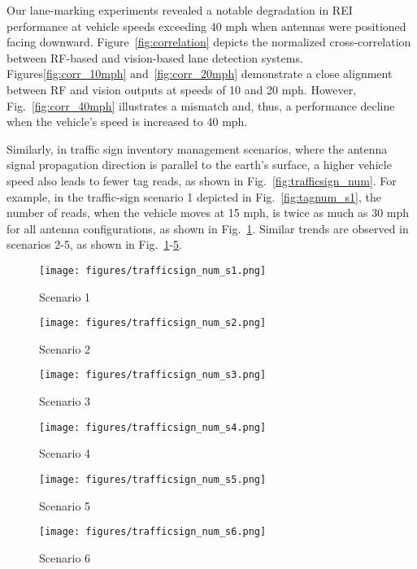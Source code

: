 \documentclass[lettersize,journal]{IEEEtran}
\begin{document}
Our lane-marking experiments revealed a notable degradation in REI performance at vehicle speeds exceeding 40 mph when antennas were positioned facing downward. Figure~\ref{fig:correlation} depicts the normalized cross-correlation between RF-based and vision-based lane detection systems. Figures\ref{fig:corr_10mph} and~\ref{fig:corr_20mph} demonstrate a close alignment between RF and vision outputs at speeds of 10 and 20 mph. However, Fig.~\ref{fig:corr_40mph} illustrates a mismatch and, thus, a performance decline when the vehicle's speed is increased to 40 mph.

Similarly, in traffic sign inventory management scenarios, where the antenna signal propagation direction is parallel to the earth's surface, a higher vehicle speed also leads to fewer tag reads, as shown in Fig.~\ref{fig:trafficsign_num}. For example, in the traffic-sign scenario 1 depicted in Fig.~\ref{fig:tagnum_s1}, the number of reads, when the vehicle moves at 15 mph, is twice as much as 30 mph for all antenna configurations, as shown in Fig.~\ref{fig:trafficsign_num_s1}. Similar trends are observed in scenarios 2-5, as shown in Fig.~\ref{fig:trafficsign_num_s1}-\ref{fig:trafficsign_num_s5}.

\begin{figure*}[tb!]
\centering
\begin{subfigure}{0.32\textwidth}
  \centering
  \texttt{[image: figures/trafficsign\_num\_s1.png]}
  \caption{Scenario 1}
  \label{fig:trafficsign_num_s1}
\end{subfigure}
\begin{subfigure}{0.32\textwidth}
  \centering
  \texttt{[image: figures/trafficsign\_num\_s2.png]}
  \caption{Scenario 2}
  \label{fig:trafficsign_num_s2}
\end{subfigure}
\begin{subfigure}{0.32\textwidth}
  \centering
  \texttt{[image: figures/trafficsign\_num\_s3.png]}
  \caption{Scenario 3}
  \label{fig:trafficsign_num_s3}
\end{subfigure}
\begin{subfigure}{0.32\textwidth}
  \centering
  \texttt{[image: figures/trafficsign\_num\_s4.png]}
  \caption{Scenario 4}
  \label{fig:trafficsign_num_s4}
\end{subfigure}
\begin{subfigure}{0.32\textwidth}
  \centering
  \texttt{[image: figures/trafficsign\_num\_s5.png]}
  \caption{Scenario 5}
  \label{fig:trafficsign_num_s5}
\end{subfigure}
\begin{subfigure}{0.32\textwidth}
  \centering
  \texttt{[image: figures/trafficsign\_num\_s6.png]}
  \caption{Scenario 6}
  \label{fig:trafficsign_num_s6}
\end{subfigure}
\caption{The number of traffic sign readings under different antenna angles and vehicle speeds}
\label{fig:trafficsign_num}
\end{figure*} 
\end{document}
